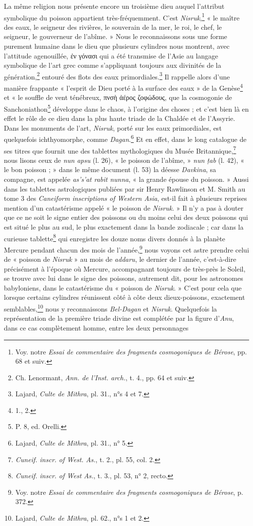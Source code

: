\documentclass[a4paper, 11pt, oneside]{article}
\begin{document}
La même religion nous présente encore un troisième dieu auquel l'attribut symbolique du poisson appartient très-fréquemment. C'est \emph{Nisruk},\footnote{Voy. notre \emph{Essai de commentaire des fragments cosmogoniques de Bérose}, pp. 68 et suiv.} « le maître des eaux, le seigneur des rivières, le souverain de la mer, le roi, le chef, le seigneur, le gouverneur de l'abîme. » Nous le reconnaissons sous une forme purement humaine dans le dieu que plusieurs cylindres nous montrent, avec l'attitude agenouillée, ἐν γόνασι qui a été transmise de l'Asie au langage symbolique de l'art grec comme s'appliquant toujours aux divinités de la génération,\footnote{Ch. Lenormant, \emph{Ann. de l'Inst. arch.}, t. 4., pp. 64 et suiv.} entouré des flots des eaux primordiales.\footnote{Lajard, \emph{Culte de Mithra}, pl. 31., n°s 4 et 7.} Il rappelle alors d'une manière frappante « l'esprit de Dieu porté à la surface des eaux » de la Genèse\footnote{1., 2.} et « le souffle de vent ténébreux, πνσὴ ἀέρος ζοφώδους, que la cosmogonie de Sanchoniathon\footnote{P. 8, ed. Orelli.} développe dans le chaos, à l'origine des choses ; et c'est bien là en effet le rôle de ce dieu dans la plus haute triade de la Chaldée et de l'Assyrie. Dans les monuments de l'art, \emph{Nisruk}, porté sur les eaux primordiales, est quelquefois ichthyomorphe, comme \emph{Dagan}.\footnote{Lajard, \emph{Culte de Mithra}, pl. 31., n° 5.} Et en effet, dans le long catalogue de ses titres que fournit une des tablettes mythologiques du Musée Britannique,\footnote{\emph{Cuneif. inscr. of West. As.}, t. 2., pl. 55, col. 2.} nous lisons ceux de \emph{nun apsu} (l. 26), « le poisson de l'abîme, » \emph{nun ṭab} (l. 42), « le bon poisson ; » dans le même document (l. 53) la déesse \emph{Davkina}, sa compagne, est appelée \emph{as's'at rabit nunna}, « la grande épouse du poisson. » Aussi dans les tablettes astrologiques publiées par sir Henry Rawlinson et M. Smith au tome 3 des \emph{Caneiform inscriptions of Western Asia}, est-il fait à plusieurs reprises mention d'un catastérisme appelé « le poisson de \emph{Nisruk}. » Il n'y a pas à douter que ce ne soit le signe entier des poissons ou du moins celui des deux poissons qui est situé le plus au sud, le plus exactement dans la bande zodiacale ; car dans la curieuse tablette\footnote{\emph{Cuneif. inscr. of West As.}, t. 3., pl. 53, n° 2, recto.} qui enregistre les douze noms divers donnés à la planète Mercure pendant chacun des mois de l'année,\footnote{Voy. notre \emph{Essai de commentaire des fragments cosmogoniques de Bérose}, p. 372.} nous voyons cet astre prendre celui de « poisson de \emph{Nisruk} » au mois de \emph{addaru}, le dernier de l'année, c'est-à-dire précisément à l'époque où Mercure, accompagnant toujours de très-près le Soleil, se trouve avec lui dans le signe des poissons, autrement dit, pour les astronomes babyloniens, dans le catastérisme du « poisson de \emph{Nisruk}. » C'est pour cela que lorsque certains cylindres réunissent côté à côte deux dieux-poissons, exactement semblables,\footnote{Lajard, \emph{Culte de Mithra}, pl. 62., n°s 1 et 2.} nous y reconnaissons \emph{Bel-Dagan} et \emph{Nisruk}. Quelquefois la représentation de la première triade divine est complétée par la figure d'\emph{Anu}, dans ce cas complètement homme, entre les deux personnages 
\end{document}
